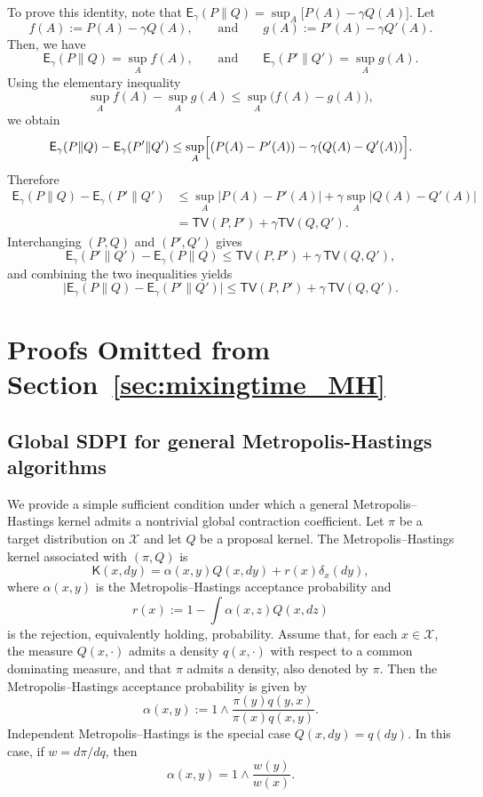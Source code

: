 \documentclass[10pt, journal]{IEEEtran}
\newcommand{\sE}{\mathsf{E}}
\newcommand{\sK}{\mathsf{K}}
\newcommand{\TV}{\mathsf{TV}}
\begin{document}
To prove this identity, note that $\sE_\gamma(P\|Q)=\sup_A \bigl[P(A)-\gamma Q(A)\bigr]$. Let
$$f(A):=P(A)-\gamma Q(A), \qquad\text{and}\qquad g(A):=P'(A)-\gamma Q'(A).$$
Then, we have 
$$\sE_\gamma(P\|Q)=\sup_A f(A), \qquad\text{and}\qquad  \sE_\gamma(P'\|Q')=\sup_A g(A).$$
Using the elementary inequality
$$\sup_A f(A)-\sup_A g(A)\le \sup_A\bigl(f(A)-g(A)\bigr),$$
we obtain
$$\sE_\gamma(P\|Q)-\sE_\gamma(P'\|Q')\le\sup_A \Bigl[(P(A)-P'(A))-\gamma(Q(A)-Q'(A))\Bigr].$$
Therefore
\begin{align*}
    \sE_\gamma(P\|Q)-\sE_\gamma(P'\|Q')&\le\sup_A |P(A)-P'(A)|+\gamma \sup_A |Q(A)-Q'(A)|\\
    & = \TV(P,P') + \gamma \TV(Q,Q').
\end{align*}
Interchanging \((P,Q)\) and \((P',Q')\) gives
$$\sE_\gamma(P'\|Q')-\sE_\gamma(P\|Q)\le\TV(P,P')+\gamma\,\TV(Q,Q'),$$
and combining the two inequalities yields
$$\bigl|\sE_\gamma(P\|Q)-\sE_\gamma(P'\|Q')\bigr|
\le\TV(P,P')+\gamma\,\TV(Q,Q').$$



\section{Proofs Omitted from Section~\ref{sec:mixingtime_MH}}


\subsection{Global SDPI for general Metropolis-Hastings algorithms}\label{app:MH_SDPI_relationship}
We provide a simple sufficient condition under which a general Metropolis--Hastings kernel admits a nontrivial global contraction coefficient. Let $\pi$ be a target distribution on $\mathcal X$ and let $Q$ be a proposal kernel. The Metropolis--Hastings kernel associated with $(\pi,Q)$ is $$\sK(x,dy)=\alpha(x,y)Q(x,dy)+r(x)\delta_x(dy),$$ where $\alpha(x,y)$ is the Metropolis--Hastings acceptance probability and $$r(x):=1-\int \alpha(x,z)Q(x,dz)$$ is the rejection, equivalently holding, probability. Assume that, for each $x\in\mathcal X$, the measure $Q(x,\cdot)$ admits a density $q(x,\cdot)$ with respect to a common dominating measure, and that $\pi$ admits a density, also denoted by $\pi$. Then the Metropolis--Hastings acceptance probability is given by $$\alpha(x,y):=1\wedge \frac{\pi(y)q(y,x)}{\pi(x)q(x,y)}.$$ Independent Metropolis--Hastings is the special case $Q(x,dy)=q(dy)$. In this case, if $w=d\pi/dq$, then $$\alpha(x,y)=1\wedge\frac{w(y)}{w(x)}.$$
\end{document}
